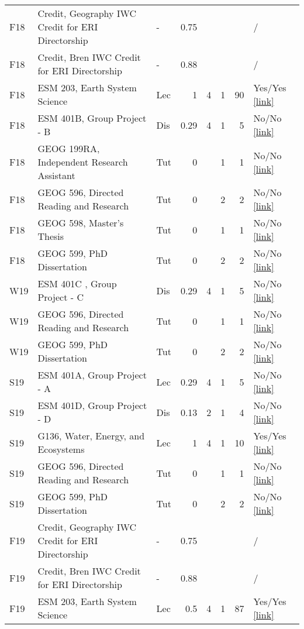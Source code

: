 \begin{longtable}{p{1cm}p{7cm}p{0.75cm}rrrrp{2.5cm}}
F18 & Credit, Geography IWC Credit for ERI Directorship & - & 0.75 &  &  &  & /  \\ 
F18 & Credit, Bren IWC Credit for ERI Directorship & - & 0.88 &  &  &  & /  \\ 
F18 & ESM 203, Earth System Science & Lec & 1 & 4 & 1 & 90 & Yes/Yes  \href{https://ucsb.box.com/s/vvhpxerul6hbzum3fvmwigzd3y8yset6}{[link]}  \\ 
F18 & ESM 401B, Group Project - B & Dis & 0.29 & 4 & 1 & 5 & No/No  \href{}{[link]}  \\ 
F18 & GEOG 199RA, Independent Research Assistant & Tut & 0 &  & 1 & 1 & No/No  \href{}{[link]}  \\ 
F18 & GEOG 596, Directed Reading and Research & Tut & 0 &  & 2 & 2 & No/No  \href{}{[link]}  \\ 
F18 & GEOG 598, Master’s Thesis & Tut & 0 &  & 1 & 1 & No/No  \href{}{[link]}  \\ 
F18 & GEOG 599, PhD Dissertation & Tut & 0 &  & 2 & 2 & No/No  \href{}{[link]}  \\ 
W19 & ESM 401C , Group Project - C & Dis & 0.29 & 4 & 1 & 5 & No/No  \href{}{[link]}  \\ 
W19 & GEOG 596, Directed Reading and Research & Tut & 0 &  & 1 & 1 & No/No  \href{}{[link]}  \\ 
W19 & GEOG 599, PhD Dissertation & Tut & 0 &  & 2 & 2 & No/No  \href{}{[link]}  \\ 
S19 & ESM 401A, Group Project - A & Lec & 0.29 & 4 & 1 & 5 & No/No  \href{}{[link]}  \\ 
S19 & ESM 401D, Group Project - D & Dis & 0.13 & 2 & 1 & 4 & No/No  \href{}{[link]}  \\ 
S19 & G136, Water, Energy, and Ecosystems & Lec & 1 & 4 & 1 & 10 & Yes/Yes  \href{https://ucsb.box.com/s/9oj1uqebr0a3gcg9brhfxw6ys8atw9oi}{[link]}  \\ 
S19 & GEOG 596, Directed Reading and Research & Tut & 0 &  & 1 & 1 & No/No  \href{}{[link]}  \\ 
S19 & GEOG 599, PhD Dissertation & Tut & 0 &  & 2 & 2 & No/No  \href{}{[link]}  \\ 
F19 & Credit, Geography IWC Credit for ERI Directorship & - & 0.75 &  &  &  & /  \\ 
F19 & Credit, Bren IWC Credit for ERI Directorship & - & 0.88 &  &  &  & /  \\ 
F19 & ESM 203, Earth System Science & Lec & 0.5 & 4 & 1 & 87 & Yes/Yes  \href{https://ucsb.box.com/s/btln348spk7zsculb0swyrqe6nt0so33}{[link]}  \\ 

\end{longtable}
